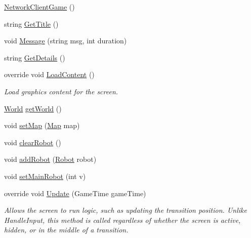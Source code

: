 \begin{DoxyCompactItemize}
\item 
\hyperlink{classgearit_1_1src_1_1_network_1_1_network_client_game_a5e0e8cef1b5eaa6eba7f566e0a493069}{Network\+Client\+Game} ()
\item 
string \hyperlink{classgearit_1_1src_1_1_network_1_1_network_client_game_a07ca780da205534ef15932ab1d587c59}{Get\+Title} ()
\item 
void \hyperlink{classgearit_1_1src_1_1_network_1_1_network_client_game_a0f80b106b64980833b69e18aceec3fc4}{Message} (string msg, int duration)
\item 
string \hyperlink{classgearit_1_1src_1_1_network_1_1_network_client_game_a9fe7eef74a95b4cb08708f53e416134e}{Get\+Details} ()
\item 
override void \hyperlink{classgearit_1_1src_1_1_network_1_1_network_client_game_a930f927ef386a875c4f7fa73de649bcd}{Load\+Content} ()
\begin{DoxyCompactList}\small\item\em Load graphics content for the screen. \end{DoxyCompactList}\item 
\hyperlink{class_farseer_physics_1_1_dynamics_1_1_world}{World} \hyperlink{classgearit_1_1src_1_1_network_1_1_network_client_game_afeb5a9c9dc33182a02329b363bf604be}{get\+World} ()
\item 
void \hyperlink{classgearit_1_1src_1_1_network_1_1_network_client_game_ad6b00d6715607942780ee05f5457e369}{set\+Map} (\hyperlink{classgearit_1_1src_1_1map_1_1_map}{Map} map)
\item 
void \hyperlink{classgearit_1_1src_1_1_network_1_1_network_client_game_a4fab5f34a6e3db723f2b850e851f4c57}{clear\+Robot} ()
\item 
void \hyperlink{classgearit_1_1src_1_1_network_1_1_network_client_game_af59e1c8ac6f4e1d0f9a6d27fe305b56f}{add\+Robot} (\hyperlink{classgearit_1_1src_1_1robot_1_1_robot}{Robot} robot)
\item 
void \hyperlink{classgearit_1_1src_1_1_network_1_1_network_client_game_ae84ef7b0cb725f7a43daee35a1bde2c1}{set\+Main\+Robot} (int v)
\item 
override void \hyperlink{classgearit_1_1src_1_1_network_1_1_network_client_game_ad022fd48695248828a0e756c3d3c929a}{Update} (Game\+Time game\+Time)
\begin{DoxyCompactList}\small\item\em Allows the screen to run logic, such as updating the transition position. Unlike Handle\+Input, this method is called regardless of whether the screen is active, hidden, or in the middle of a transition. \end{DoxyCompactList}\item 

\end{DoxyCompactItemize}
